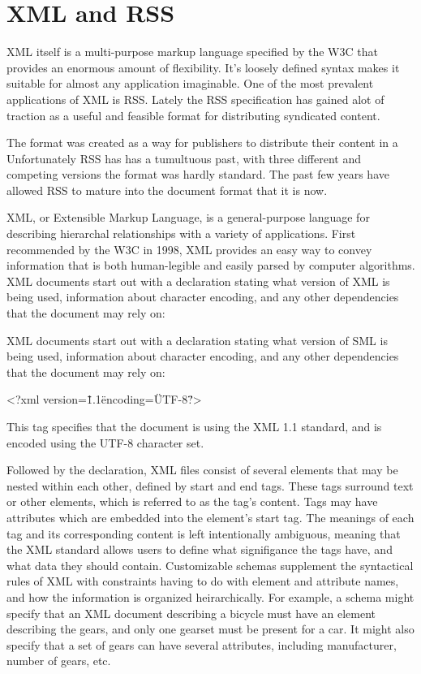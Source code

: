\documentclass[a4paper,12pt]{report}
\begin{document}
\section{XML and RSS}
XML itself is a multi-purpose markup language specified by the W3C that provides an enormous amount of flexibility.
It's loosely defined syntax makes it suitable for almost any application imaginable.
One of the most prevalent applications of XML is RSS.
Lately the RSS specification has gained alot of traction as a useful and feasible format for distributing syndicated content.

The format was created as a way for publishers to distribute their content in a 
Unfortunately RSS has has a tumultuous past, with three different and competing versions the format was hardly standard.
The past few years have allowed RSS to mature into the document format that it is now.

XML, or Extensible Markup Language, is a general-purpose language for describing hierarchal relationships with a variety of applications. 
First recommended by the W3C in 1998, XML provides an easy way to convey information that is both human-legible and easily parsed by computer algorithms. 
XML documents start out with a declaration stating what version of XML is being used, information about character encoding, and any other dependencies that the document may rely on:

XML documents start out with a declaration stating what version of SML is being used, information about character encoding, and any other dependencies that the document may rely on:

<?xml version=\"1.1\" encoding=\"UTF-8\"?>

This tag specifies that the document is using the XML 1.1 standard, and is encoded using the UTF-8 character set.

Followed by the declaration, XML files consist of several elements that may be nested within each other, defined by start and end tags.
These tags surround text or other elements, which is referred to as the tag's content.
Tags may have attributes which are embedded into the element's start tag. 
The meanings of each tag and its corresponding content is left intentionally ambiguous, meaning that the XML standard allows users to define what signifigance the tags have, and what data they should contain. 
Customizable schemas supplement the syntactical rules of XML with constraints having to do with element and attribute names, and how the information is organized heirarchically. 
For example, a schema might specify that an XML document describing a bicycle must have an element describing the gears, and only one gearset must be present for a car. 
It might also specify that a set of gears can have several attributes, including manufacturer, number of gears, etc. 
\end{document}
